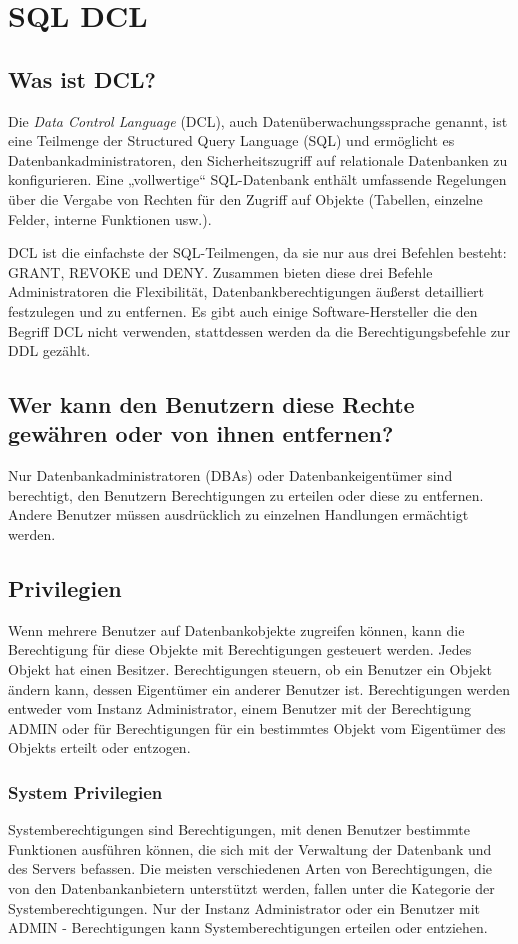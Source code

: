\chapter{SQL DCL}\label{cha:dcl}

\section{Was ist DCL?}
Die \emph{Data Control Language} (DCL), auch Datenüberwachungssprache genannt, ist eine Teilmenge der Structured Query Language (SQL) und ermöglicht es Datenbankadministratoren, den Sicherheitszugriff auf relationale Datenbanken zu konfigurieren. Eine „vollwertige“ SQL-Datenbank enthält umfassende Regelungen über die Vergabe von Rechten für den Zugriff auf Objekte (Tabellen, einzelne Felder, interne Funktionen usw.).

DCL ist die einfachste der SQL-Teilmengen, da sie nur aus drei Befehlen besteht: GRANT, REVOKE und DENY. Zusammen bieten diese drei Befehle Administratoren die Flexibilität, Datenbankberechtigungen äußerst detailliert festzulegen und zu entfernen. Es gibt auch einige Software-Hersteller die den Begriff DCL nicht verwenden, stattdessen werden da die Berechtigungsbefehle zur DDL gezählt. 

\section{Wer kann den Benutzern diese Rechte gewähren oder von ihnen entfernen?}
Nur Datenbankadministratoren (DBAs) oder Datenbankeigentümer sind berechtigt, den Benutzern Berechtigungen zu erteilen oder diese zu entfernen. Andere Benutzer müssen ausdrücklich zu einzelnen Handlungen ermächtigt werden. 

\section{Privilegien}
Wenn mehrere Benutzer auf Datenbankobjekte zugreifen können, kann die Berechtigung für diese Objekte mit Berechtigungen gesteuert werden. Jedes Objekt hat einen Besitzer. Berechtigungen steuern, ob ein Benutzer ein Objekt ändern kann, dessen Eigentümer ein anderer Benutzer ist. Berechtigungen werden entweder vom Instanz Administrator, einem Benutzer mit der Berechtigung ADMIN oder für Berechtigungen für ein bestimmtes Objekt vom Eigentümer des Objekts erteilt oder entzogen.

\subsection{System Privilegien}
Systemberechtigungen sind Berechtigungen, mit denen Benutzer bestimmte Funktionen ausführen können, die sich mit der Verwaltung der Datenbank und des Servers befassen. Die meisten verschiedenen Arten von Berechtigungen, die von den Datenbankanbietern unterstützt werden, fallen unter die Kategorie der Systemberechtigungen. Nur der Instanz Administrator oder ein Benutzer mit ADMIN - Berechtigungen kann Systemberechtigungen erteilen oder entziehen. 

